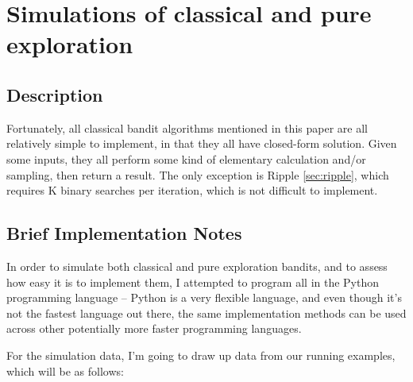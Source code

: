 \chapter*{Simulations of classical and pure exploration}
\label{cha:simulations} %

\section{Description}

Fortunately, all classical bandit algorithms mentioned in this paper are all relatively simple to implement, in that they all have closed-form solution. Given some inputs, they all perform some kind of elementary calculation and/or sampling, then return a result. The only exception is Ripple \ref{sec:ripple}, which requires K binary searches per iteration, which is not difficult to implement.



\section{Brief Implementation Notes}

In order to simulate both classical and pure exploration bandits, and to assess how easy it is to implement them, I attempted to program all in the Python programming language – Python is a very flexible language, and even though it’s not the fastest language out there, the same implementation methods can be used across other potentially more faster programming languages.

For the simulation data, I'm going to draw up data from our running examples, which will be as follows:

